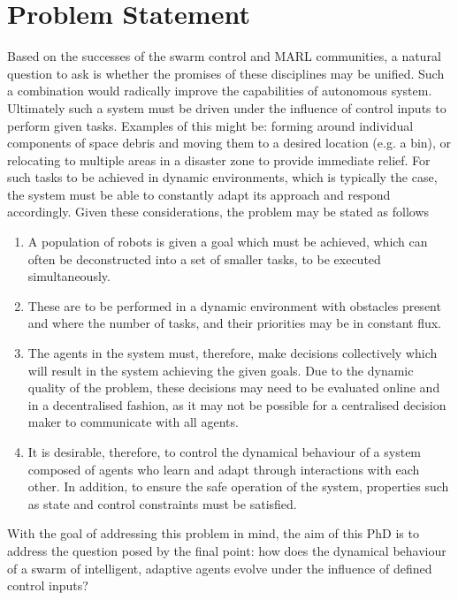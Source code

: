 \documentclass[.../main.tex]{subfiles}
\begin{document}
    \section{Problem Statement} \label{sec::Problem_Statement}

    Based on the successes of the swarm control and MARL communities, a natural question to ask is
    whether the promises of these disciplines may be unified. Such a combination would radically
    improve the capabilities of autonomous system. Ultimately such a system must be driven under the
    influence of control inputs to perform given tasks. Examples of this might be: forming around
    individual components of space debris and moving them to a desired location (e.g. a bin), or
    relocating to multiple areas in a disaster zone to provide immediate relief. For such tasks to
    be achieved in dynamic environments, which is typically the case, the system must be able to
    constantly adapt its approach and respond accordingly. Given these considerations, the problem
    may be stated as follows

    \begin{enumerate}
    	\item A population of robots is given a goal which must be achieved, which can often be
    	deconstructed into a set of smaller tasks, to be executed simultaneously. 
    	\item These are to be performed in a dynamic environment with obstacles present and where
    	the number of tasks, and their priorities may be in constant flux.
    	\item The agents in the system must, therefore, make decisions collectively which will result
        in the system achieving the given goals. Due to the dynamic quality of the problem, these
        decisions may need to be evaluated online and in a decentralised fashion, as it may not be
        possible for a centralised decision maker to communicate with all agents. 
        \item It is desirable, therefore, to control the dynamical behaviour of
    	a system composed of agents who learn and adapt through interactions with each other. In
    	addition, to ensure the safe operation of the system, properties such as state and control
    	constraints must be satisfied.
    \end{enumerate}


    With the goal of addressing this problem in mind, the aim of this PhD is to address the question
    posed by the final point: how does the dynamical behaviour of a swarm of intelligent, adaptive
    agents evolve under the influence of defined control inputs?
\end{document}
